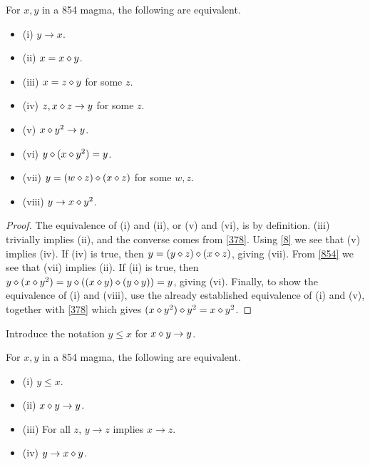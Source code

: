 \begin{lemma}[854 equivalences, I]\label{854-equiv}  For $x, y$ in a 854 magma, the following are equivalent.
  \begin{itemize}
  \item (i) $y \to x$.
  \item (ii) $x = x \diamond y$.
  \item (iii) $x = z \diamond y$ for some $z$.
  \item (iv) $z, x \diamond z \to y$ for some $z$.
  \item (v) $x \diamond y^2 \to y$.
  \item (vi) $y \diamond (x \diamond y^2) = y$.
  \item (vii) $y = (w \diamond z) \diamond (x \diamond z)$ for some $w,z$.
  \item (viii) $y \to x \diamond y^2$.
  \end{itemize}
\end{lemma}

\begin{proof} The equivalence of (i) and (ii), or (v) and (vi), is by definition.  (iii) trivially implies (ii), and the converse comes from \eqref{378}.  Using \eqref{8} we see that (v) implies (iv).  If (iv) is true, then $y = (y \diamond z) \diamond (x \diamond z)$, giving (vii).  From \eqref{854} we see that (vii) implies (ii).  If (ii) is true, then $y \diamond (x \diamond y^2) = y \diamond ((x \diamond y) \diamond (y \diamond y)) = y$, giving (vi).  Finally, to show the equivalence of (i) and (viii), use the already established equivalence of (i) and (v), together with \eqref{378} which gives $(x \diamond y^2) \diamond y^2 = x \diamond y^2$.
\end{proof}

Introduce the notation $y \leq x$ for $x \diamond y \to y$.

\begin{lemma}[854 equivalences, II]\label{854-equiv-2}  For $x,y$ in a 854 magma, the following are equivalent.
  \begin{itemize}
  \item (i) $y \leq x$.
  \item (ii) $x \diamond y \to y$.
  \item (iii)  For all $z$, $y \to z$ implies $x \to z$.
  \item (iv) $y \to x \diamond y$.
  \end{itemize}
\end{lemma}

